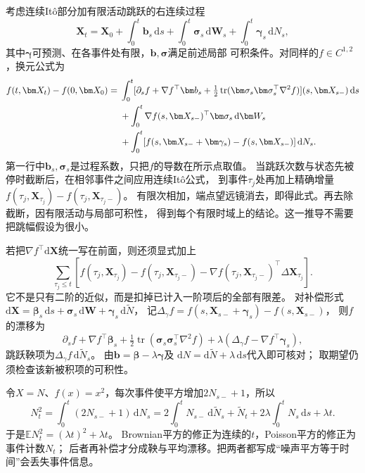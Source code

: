 考虑连续Itô部分加有限活动跳跃的右连续过程
\[
  \bm X_t=\bm X_0+\int_0^t\bm b_s\,\mathrm ds
        +\int_0^t\bm\sigma_s\,\mathrm d\bm W_s
        +\int_0^t\bm\gamma_s\,\mathrm dN_s,
\]
其中$\bm\gamma$可预测、在各事件处有限，$\bm b,\bm\sigma$满足前述局部
可积条件。对同样的$f\in C^{1,2}$，换元公式为
\begin{align}
 f(t,\bm X_t)-f(0,\bm X_0)
  ={}&\int_0^t[\partial_s f+\nabla f^\top\bm b_s
       +\tfrac12\operatorname{tr}(\bm\sigma_s\bm\sigma_s^\top\nabla^2f)]
                           (s,\bm X_{s-})\,\mathrm ds\notag\\
   &+\int_0^t\nabla f(s,\bm X_{s-})^\top\bm\sigma_s\,\mathrm d\bm W_s\notag\\
   &+\int_0^t[f(s,\bm X_{s-}+\bm\gamma_s)-f(s,\bm X_{s-})]\,\mathrm dN_s.
 \label{eq:action-state-jump-ito}
\end{align}
第一行中$\bm b_s,\bm\sigma_s$是过程系数，只把$f$的导数在所示点取值。
当跳跃次数与状态先被停时截断后，在相邻事件之间应用连续Itô公式，
到事件$\tau_j$处再加上精确增量
$f(\tau_j,\bm X_{\tau_j})-f(\tau_j,\bm X_{\tau_j-})$。
有限次相加，端点望远镜消去，即得此式。再去除截断，因有限活动与局部可积性，
得到每个有限时域上的结论。这一推导不需要把跳幅假设为很小。

若把$\nabla f^\top\mathrm d\bm X$统一写在前面，则还须显式加上
\[
 \sum_{\tau_j\leq t}
 [f(\tau_j,\bm X_{\tau_j})-f(\tau_j,\bm X_{\tau_j-})
          -\nabla f(\tau_j,\bm X_{\tau_j-})^\top\Delta\bm X_{\tau_j}].
\]
它不是只有二阶的近似，而是扣掉已计入一阶项后的全部有限差。
对补偿形式
$\mathrm d\bm X=\bm\beta_s\,\mathrm ds+\bm\sigma_s\,\mathrm d\bm W
                      +\bm\gamma_s\,\mathrm d\widetilde N$，
记$\Delta_\gamma f=f(s,\bm X_{s-}+\bm\gamma_s)-f(s,\bm X_{s-})$，
则$f$的漂移为
\[
 \partial_s f+\nabla f^\top\bm\beta_s
 +\tfrac12\operatorname{tr}(\bm\sigma_s\bm\sigma_s^\top\nabla^2f)
 +\lambda(\Delta_\gamma f-\nabla f^\top\bm\gamma_s),
\]
跳跃鞅项为$\Delta_\gamma f\,\mathrm d\widetilde N_s$。
由$\bm b=\bm\beta-\lambda\bm\gamma$及
$\mathrm dN=\mathrm d\widetilde N+\lambda\,\mathrm ds$代入即可核对；
取期望仍须检查该新被积项的可积性。

令$X=N$、$f(x)=x^2$，每次事件使平方增加$2N_{s-}+1$，所以
\[
  N_t^2=\int_0^t(2N_{s-}+1)\,\mathrm dN_s
       =2\int_0^tN_{s-}\,\mathrm d\widetilde N_s
         +\widetilde N_t+2\lambda\int_0^tN_s\,\mathrm ds+\lambda t.
\]
于是$\mathbb E N_t^2=(\lambda t)^2+\lambda t$。
Brownian平方的修正为连续的$t$，Poisson平方的修正为事件计数$N_t$；
后者再补偿才分成鞅与平均漂移。把两者都写成“噪声平方等于时间”会丢失事件信息。

